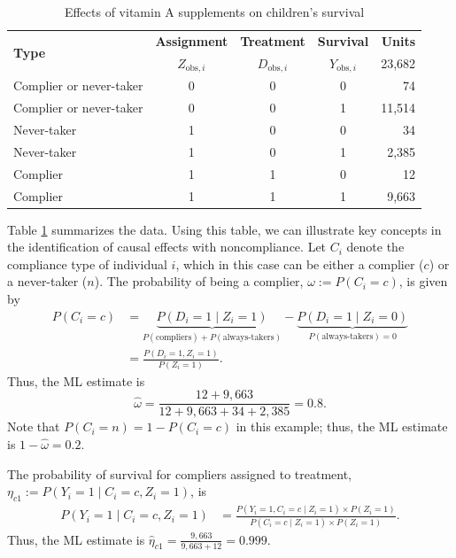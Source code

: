 \begin{table}[h!]
	\caption{Effects of vitamin A supplements on children's survival \cite{imbens1997bayesian}}
	\label{tab:observed_data}
	\begin{minipage}{0.5\textwidth}
		\begin{tabular}{lcccr}
			\hline
			\multirow{2}{*}{\textbf{Type}} & \textbf{Assignment} & \textbf{Treatment} & \textbf{Survival}  & \textbf{Units} \\
			& $Z_{\text{obs},i}$ & $D_{\text{obs},i}$ & $Y_{\text{obs},i}$ & 23,682 \\
			\hline
			Complier or never-taker & 0 & 0 & 0 & 74 \\
			Complier or never-taker & 0 & 0 & 1 & 11,514 \\
			Never-taker & 1 & 0 & 0 & 34 \\
			Never-taker & 1 & 0 & 1 & 2,385 \\
			Complier & 1 & 1 & 0 & 12 \\
			Complier & 1 & 1 & 1 & 9,663 \\
			\hline
		\end{tabular}
	\end{minipage}
\end{table}

Table \ref{tab:observed_data} summarizes the data. Using this table, we can illustrate key concepts in the identification of causal effects with noncompliance. Let $C_i$ denote the compliance type of individual $i$, which in this case can be either a complier ($c$) or a never-taker ($n$). The probability of being a complier, $\omega := P(C_i = c)$, is given by
\begin{align*}
	P(C_i = c) 
	&= \underbrace{P(D_i = 1 \mid Z_i = 1)}_{P(\text{compliers}) + P(\text{always-takers})} 
	- \underbrace{P(D_i = 1 \mid Z_i = 0)}_{P(\text{always-takers}) = 0} \\
	&= \frac{P(D_i = 1, Z_i = 1)}{P(Z_i = 1)}.
\end{align*}
Thus, the ML estimate is
\[
\hat{\omega} = \frac{12 + 9{,}663}{12 + 9{,}663 + 34 + 2{,}385}= 0.8.
\]
Note that $P(C_i = n) = 1 - P(C_i = c)$ in this example; thus, the ML estimate is $1-\hat{\omega} = 0.2$.

The probability of survival for compliers assigned to treatment, $\eta_{c1} := P(Y_i = 1 \mid C_i = c, Z_i = 1)$, is
\begin{align*}
	P(Y_i = 1 \mid C_i = c, Z_i = 1) 
	&= \frac{P(Y_i = 1, C_i = c \mid Z_i = 1) \times P(Z_i = 1)}{P(C_i = c \mid Z_i = 1) \times P(Z_i = 1)}.
\end{align*}
Thus, the ML estimate is $\hat{\eta}_{c1}= \frac{9{,}663}{9{,}663 + 12}= 0.999.$

